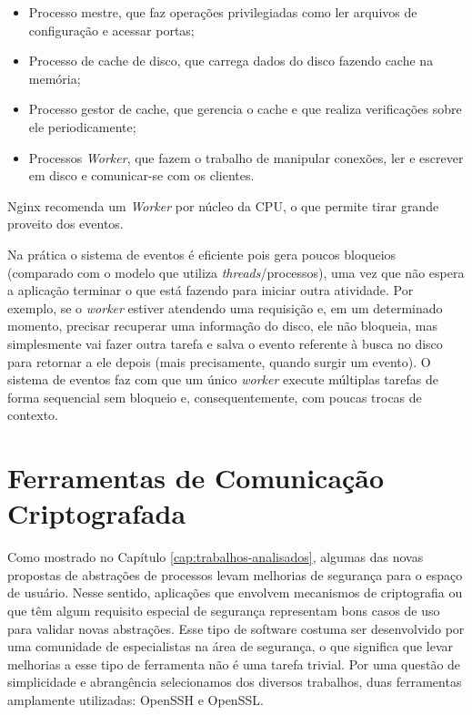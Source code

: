 \begin{itemize}
  \item Processo mestre, que faz operações privilegiadas como ler arquivos de configuração e acessar portas;
  \item Processo de cache de disco, que carrega dados do disco fazendo cache na memória;
  \item Processo gestor de cache, que gerencia o cache e que realiza verificações sobre ele periodicamente;
  \item Processos \emph{Worker}, que fazem o trabalho de manipular conexões, ler e escrever em disco e comunicar-se com os clientes.
\end{itemize}

Nginx recomenda um \emph{Worker} por núcleo da CPU, o que permite tirar
grande proveito dos eventos.

Na prática o sistema de eventos é eficiente pois gera poucos bloqueios
(comparado com o modelo que utiliza \emph{threads}/processos), uma vez que não espera
a aplicação terminar o que está fazendo para iniciar outra atividade. Por
exemplo, se o \emph{worker} estiver atendendo uma requisição e, em um
determinado momento, precisar recuperar uma informação do disco, ele não
bloqueia, mas simplesmente vai fazer outra tarefa e salva o evento referente à
busca no disco para retornar a ele depois (mais precisamente, quando surgir um
evento). O sistema de eventos faz com que um único \emph{worker} execute
múltiplas tarefas de forma sequencial sem bloqueio e, consequentemente, com
poucas trocas de contexto.

\section{Ferramentas de Comunicação Criptografada}
\label{sec:com_enc}

Como mostrado no Capítulo \ref{cap:trabalhos-analisados}, algumas das novas
propostas de abstrações de processos levam melhorias de segurança para o espaço
de usuário. Nesse sentido, aplicações que envolvem mecanismos de criptografia
ou que têm algum requisito especial de segurança representam bons casos de uso
para validar novas abstrações. Esse tipo de software costuma ser desenvolvido
por uma comunidade de especialistas na área de segurança, o que significa que
levar melhorias a esse tipo de ferramenta não é uma tarefa trivial. Por uma
questão de simplicidade e abrangência selecionamos dos diversos trabalhos, duas
ferramentas amplamente utilizadas: OpenSSH e OpenSSL.

